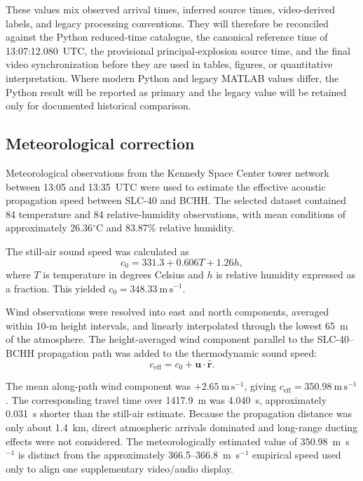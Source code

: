 \documentclass[]{seismica}
\begin{document}
These values mix observed arrival times, inferred source times, video-derived
labels, and legacy processing conventions. They will therefore be reconciled
against the Python reduced-time catalogue, the canonical reference time of
13:07:12.080~UTC, the provisional principal-explosion source time, and the
final video synchronization before they are used in tables, figures, or
quantitative interpretation. Where modern Python and legacy MATLAB values
differ, the Python result will be reported as primary and the legacy value will
be retained only for documented historical comparison.


\subsection{Meteorological correction}

Meteorological observations from the Kennedy Space Center tower network between
13:05 and 13:35~UTC were used to estimate the effective acoustic propagation
speed between SLC-40 and BCHH. The selected dataset contained 84 temperature
and 84 relative-humidity observations, with mean conditions of approximately
26.36$^\circ$C and 83.87\% relative humidity.

The still-air sound speed was calculated as
\begin{equation}
  c_0 = 331.3 + 0.606T + 1.26h,
  \label{eq:sound_speed}
\end{equation}
where $T$ is temperature in degrees Celsius and $h$ is relative humidity
expressed as a fraction. This yielded
$c_0=348.33~\mathrm{m\,s^{-1}}$.

Wind observations were resolved into east and north components, averaged
within 10-m height intervals, and linearly interpolated through the lowest
65~m of the atmosphere. The height-averaged wind component parallel to the
SLC-40--BCHH propagation path was added to the thermodynamic sound speed:
\begin{equation}
  c_{\mathrm{eff}} =
  c_0 + \mathbf{u}\cdot\hat{\mathbf{r}}.
  \label{eq:effective_speed}
\end{equation}

The mean along-path wind component was $+2.65~\mathrm{m\,s^{-1}}$, giving
$c_{\mathrm{eff}}=350.98~\mathrm{m\,s^{-1}}$. The corresponding travel time
over 1417.9~m was 4.040~s, approximately 0.031~s shorter than the still-air
estimate. Because the propagation distance was only about 1.4~km, direct
atmospheric arrivals dominated and long-range ducting effects were not
considered. The meteorologically estimated value of
350.98~m~s$^{-1}$ is distinct from the approximately
366.5--366.8~m~s$^{-1}$ empirical speed used only to align one supplementary
video/audio display.
\end{document}
